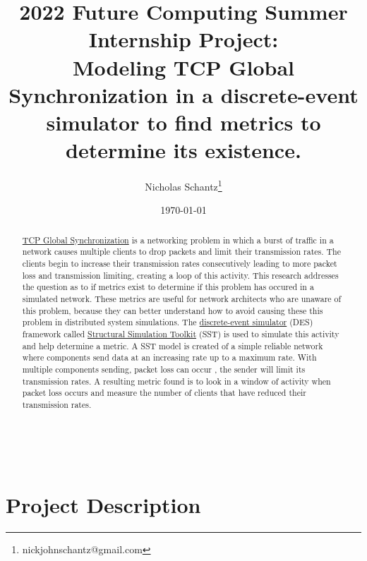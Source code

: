 \documentclass{article}
\begin{document}
    \begin{minipage}[h]{\textwidth}
        \title{2022 Future Computing Summer Internship Project:\\Modeling TCP Global Synchronization in a discrete-event simulator to find metrics to determine its existence.}
        \author{Nicholas Schantz\footnote{nickjohnschantz@gmail.com}} 
        \date{\today}
            \maketitle
        \begin{abstract}
            \href{https://en.wikipedia.org/wiki/TCP_global_synchronization}{TCP Global Synchronization} is a networking problem in which a burst of traffic in a network causes multiple clients to drop packets and limit their transmission rates. The clients begin to increase their transmission rates consecutively leading to more packet loss and transmission limiting, creating a loop of this activity. This research addresses the question as to if metrics exist to determine if this problem has occured in a simulated network. These metrics are useful for network architects who are unaware of this problem, because they can better understand how to avoid causing these this problem in distributed system simulations. The \href{https://en.wikipedia.org/wiki/Discrete-event_simulation}{discrete-event simulator} (DES) framework called \href{http://sst-simulator.org/}{Structural Simulation Toolkit} (SST) is used to simulate this activity and help determine a metric. A SST model is created of a simple reliable network where components send data at an increasing rate up to a maximum rate. With multiple components sending, packet loss can occur , the sender will limit its transmission rates.
             A resulting metric found is to look in a window of activity when packet loss occurs and measure the number of clients that have reduced their transmission rates.

        \end{abstract}
    \end{minipage}

\ \\



\section{Project Description} %
\end{document}
